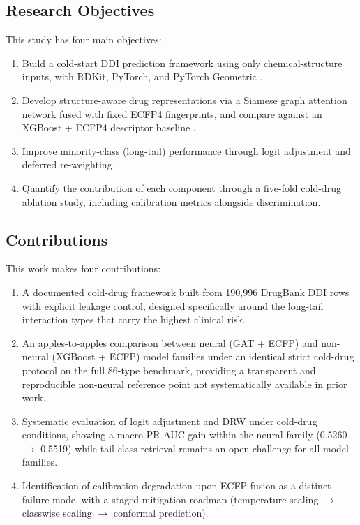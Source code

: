 \documentclass[11pt,a4paper,twocolumn]{article}
\begin{document}
\subsection{Research Objectives}
This study has four main objectives:
\begin{enumerate}
\item Build a cold-start DDI prediction framework using only chemical-structure
      inputs, with RDKit, PyTorch, and PyTorch Geometric \cite{fey2019pyg}.
\item Develop structure-aware drug representations via a Siamese graph attention
      network fused with fixed ECFP4 fingerprints,
      and compare against an XGBoost + ECFP4 descriptor baseline
      \cite{velickovic2018gat, rogers2010ecfp}.
\item Improve minority-class (long-tail) performance through logit adjustment and
      deferred re-weighting \cite{menon2021logit, cao2019ldam}.
\item Quantify the contribution of each component through a five-fold cold-drug
      ablation study, including calibration metrics alongside discrimination.
\end{enumerate}

\subsection{Contributions}
This work makes four contributions:
\begin{enumerate}
\item A documented cold-drug framework built from 190{,}996 DrugBank DDI rows with
      explicit leakage control, designed specifically around the long-tail
      interaction types that carry the highest clinical risk.
\item An apples-to-apples comparison between neural (GAT + ECFP) and non-neural
      (XGBoost + ECFP) model families under an identical strict cold-drug protocol
      on the full 86-type benchmark, providing a transparent and reproducible
      non-neural reference point not systematically available in prior work.
\item Systematic evaluation of logit adjustment and DRW under cold-drug conditions,
      showing a macro PR-AUC gain within the neural family (0.5260 $\to$ 0.5519)
      while tail-class retrieval remains an open challenge for all model families.
\item Identification of calibration degradation upon ECFP fusion as a distinct
      failure mode, with a staged mitigation roadmap (temperature scaling $\to$
      classwise scaling $\to$ conformal prediction).
\end{enumerate}
\end{document}
